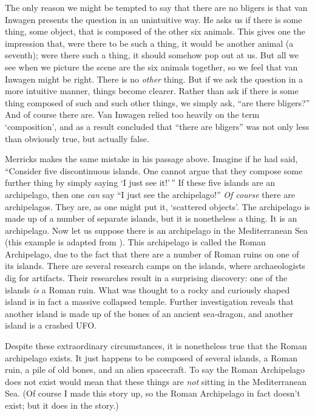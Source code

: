 \documentclass[11pt]{article}
\begin{document}
\begin{spacing}{1.25}
The only reason we might be tempted to say that there are no bligers
is that van Inwagen presents the question in an unintuitive way.  He
asks us if there is some thing, some object, that is composed of the
other six animals.  This gives one the impression that, were there to
be such a thing, it would be another animal (a seventh); were there
such a thing, it should somehow pop out at us.  But all we see when we
picture the scene are the six animals together, so we feel that van
Inwagen might be right.  There is no {\em other} thing.  But if we ask
the question in a more intuitive manner, things become clearer.
Rather than ask if there is some thing composed of such and such other
things, we simply ask, ``are there bligers?''  And of course there
are.  Van Inwagen relied too heavily on the term `composition', and as
a result concluded that ``there are bligers'' was not only less than
obviously true, but actually false.

Merricks makes the same mistake in his passage above.  Imagine if he
had said, ``Consider five discontinuous islands.  One cannot argue
that they compose some further thing by simply saying `I just see
it!'\,'' If these five islands are an archipelago, then one {\em can}
say ``I just see the archipelago!''  {\em Of course} there are
archipelagos.  They are, as one might put it, `scattered objects'.
The archipelago is made up of a number of separate islands, but it is
nonetheless a thing.  It is an archipelago.  Now let us suppose there
is an archipelago in the Mediterranean Sea (this example is adapted
from \citeyearpar{hawthorne2008}).  This archipelago is called the
Roman Archipelago, due to the fact that there are a number of Roman
ruins on one of its islands.  There are several research camps on the
islands, where archaeologists dig for artifacts.  Their researches
result in a surprising discovery: one of the islands {\em is} a Roman
ruin.  What was thought to a rocky and curiously shaped island is in
fact a massive collapsed temple.  Further investigation reveals that
another island is made up of the bones of an ancient sea-dragon, and
another island is a crashed UFO.

Despite these extraordinary circumstances, it is nonetheless true that
the Roman archipelago exists.  It just happens to be composed of
several islands, a Roman ruin, a pile of old bones, and an alien
spacecraft.  To say the Roman Archipelago does not exist would mean
that these things are {\em not} sitting in the Mediterranean Sea.  (Of
course I made this story up, so the Roman Archipelago in fact doesn't
exist; but it does in the story.)


\end{spacing}
\end{document}

